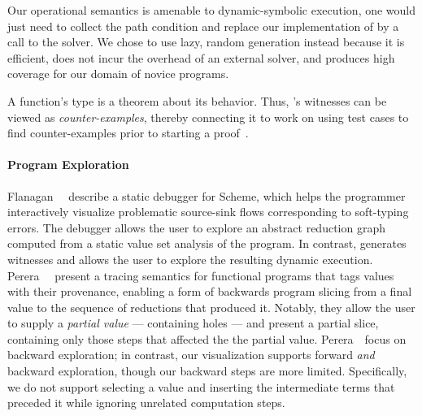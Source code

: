 Our operational semantics is amenable to dynamic-symbolic execution, one
would just need to collect the path condition and replace our
implementation of \gensym by a call to the solver. We chose to use lazy,
random generation instead because it is efficient, does not incur
the overhead of an external solver, and produces high coverage for our
domain of novice programs.

A function's type is a theorem about its behavior.
Thus, \toolname's witnesses can be viewed as \emph{counter-examples},
thereby connecting it to work on using test cases to find
counter-examples prior to starting a proof~\cite{ACL2Testing, Seidel15}.


\paragraph{Program Exploration}

Flanagan~\etal~ describe a static debugger for Scheme, which helps
the programmer interactively visualize problematic source-sink flows
corresponding to soft-typing errors. The debugger allows the user to explore
an abstract reduction graph computed from a static value set analysis of
the program. In contrast, \toolname generates witnesses and allows the user
to explore the resulting dynamic execution.
%
Perera~\etal~ present a tracing semantics
for functional programs that tags values with their provenance, enabling
a form of backwards program slicing from a final value to the sequence
of reductions that produced it. Notably, they allow the user to supply a
\emph{partial value} --- containing holes --- and present a partial slice,
containing only those steps that affected the the partial value.
Perera~\etal\ focus on backward exploration; in contrast, our
visualization supports forward \emph{and} backward exploration, though
our backward steps are more limited.
%
Specifically, we do not support selecting a value and inserting the
intermediate terms that preceded it while ignoring unrelated computation
steps. %


